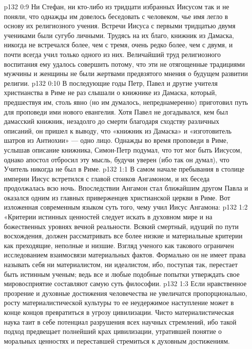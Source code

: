 \vs p132 0:9 \pc Ни Стефан, ни кто\hyp{}либо из тридцати избранных Иисусом так и не поняли, что однажды им довелось беседовать с человеком, чье имя легло в основу их религиозного учения. Встречи Иисуса с первыми тридцатью двумя учениками были сугубо личными. Трудясь на их благо, книжник из Дамаска, никогда не встречался более, чем с тремя, очень редко более, чем с двумя, и почти всегда учил только одного из них. Величайший труд религиозного воспитания ему удалось совершить потому, что эти не отягощенные традициями мужчины и женщины не были жертвами предвзятого мнения о будущем развитии религии.
\vs p132 0:10 В последующие годы Петр, Павел и другие учителя христианства в Риме не раз слышали о книжнике из Дамаска, который, предшествуя им, столь явно (но им думалось, непреднамеренно) приготовил путь для проповеди ими нового евангелия. Хотя Павел не догадывался, кем был дамасский книжник, незадолго до смерти благодаря сходству различных описаний, он пришел к выводу, что «книжник из Дамаска» и «изготовитель шатров из Антиохии» --- одно лицо. Однажды во время проповеди в Риме, услышав описание книжника, Симон\hyp{}Петр подумал, что тот мог быть Иисусом, однако апостол отбросил эту мысль, будучи уверен (ибо так он думал), что Учитель никогда не был в Риме.
\vs p132 1:1 В самом начале пребывания в столице империи Иисус встретился с главой стоиков Ангамоном, и их беседа продолжалась всю ночь. Впоследствии Ангамон стал ближайшим другом Павла и оказался одним из главных приверженцев христианской церкви в Риме. Вот изложенная современным языком суть того, чему учил Иисус Ангамона:
\vs p132 1:2 \pc «Критерии истинных ценностей следует искать в духовном мире и на божественных уровнях вечной реальности. Всякий смертный, идущий по пути восхождения, должен рассматривать все более низкие и материальные критерии как преходящие, неполные и низшие. Взгляд ученого как такового ограничен исследованием взаимосвязи материальных фактов. Формально он не имеет права называть себя ни материалистом, ни идеалистом, ибо, поступая так, перестает быть истинным ученым; ведь все и любые подобные попытки утверждать свое мировосприятие составляют самую суть философии.
\vs p132 1:3 Если нравственное прозрение и духовные достижения человечества не увеличатся пропорционально, росту материалистической культуры то ее неудержимое наступление может в конце концов превратиться в угрозу цивилизации. Чисто материалистическая наука таит в себе потенциал разрушения всех научных стремлений, ибо такой подход предвещает полнейший крах цивилизации, утратившей понятие о моральных ценностях и переставшей стремиться к духовным достижениям.
